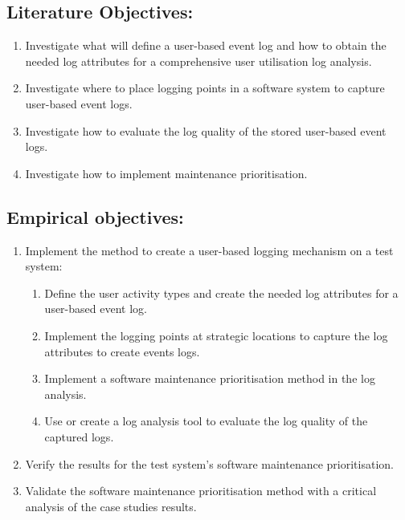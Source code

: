 \newcommand{\objAi}{Investigate what will define a user-based event log and how to obtain the needed log attributes for a comprehensive user utilisation log analysis.}
\newcommand{\objAii}{Investigate where to place logging points in a software system to capture user-based event logs.}
\newcommand{\objAiii}{Investigate how to evaluate the log quality of the stored user-based event logs.}
\newcommand{\objAiv}{Investigate how to implement maintenance prioritisation.}

\newcommand{\objBi}{Implement the method to create a user-based logging mechanism on a test system}
\newcommand{\objBiSubA}{Define the user activity types and create the needed log attributes for a user-based event log.}
\newcommand{\objBiSubB}{Implement the logging points at strategic locations to capture the log attributes to create events logs.}
\newcommand{\objBiSubC}{Use or create a log analysis tool to evaluate the log quality of the captured logs.}
\newcommand{\objBiSubD}{Implement a software maintenance prioritisation method in the log analysis.}
\newcommand{\objBii}{Verify the results for the test system's software maintenance prioritisation.}
\newcommand{\objBiii}{Validate the software maintenance prioritisation method with a critical analysis of the case studies results.}


\subsection{Literature Objectives:}\label{sec:ch1_literatureObjective}
\begin{enumerate}
	\item \objAi
	\item \objAii
	\item \objAiii
	\item \objAiv 
\end{enumerate}

\subsection{Empirical objectives:}\label{sec:ch1_empiricalObjective}
\begin{enumerate}
	\item \objBi: 
		\begin{enumerate}
			\item \objBiSubA
			\item \objBiSubB
			\item \objBiSubD
			\item \objBiSubC
		\end{enumerate}
	\item \objBii
	\item \objBiii
\end{enumerate}

